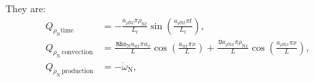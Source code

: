 \documentclass[10pt]{article}
\newcommand{\Rho}{\,\mathtt{Rho}}
\newcommand{\U}{\,\mathtt{U}}
\newcommand{\N}{\text{N}}
\newcommand{\convection}{\,\text{convection}}
\newcommand{\production}{\,\text{production}}
\newcommand{\diffusion}{\,\text{diffusion}}
\begin{document}
They are:
\begin{equation*}
\begin{split}
%
 Q_{\rho_{\N}\text{time}} &=- \frac{ a_{ \rho \N t} \pi \rho_{\N t} }{L_t}\sin\left(\frac{a_{ \rho \N t} \pi t}{L_t}\right),\\
%
 Q_{\rho_{\N}\convection} &= 
\frac{\Rho_{\N} a_{ux} \pi u_{x} }{L} \cos\left(\frac{a_{ux} \pi x}{L}\right)+ \frac{\U a_{ \rho \N x} \pi \rho_{\N x}
}{L}\cos\left(\frac{a_{ \rho \N x} \pi x}{L}\right),\\ 
%
Q_{\rho_{\N}\production} &= - \dot{\omega}_{\N},\\
%
\end{split}
\end{equation*}
\end{document}
